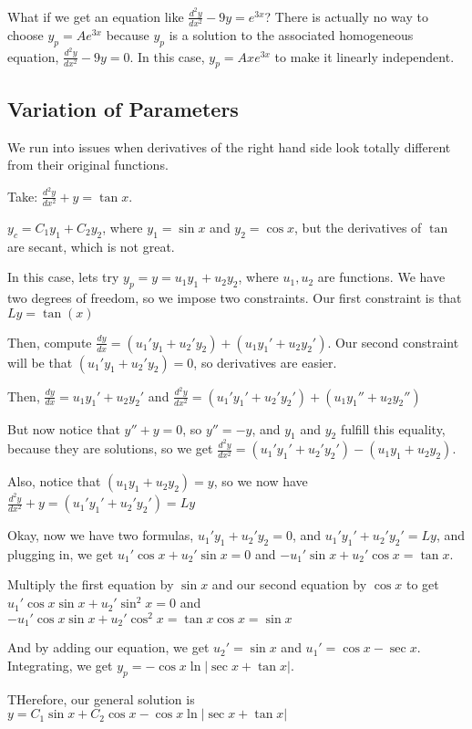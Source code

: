 \documentclass{article}
\begin{document}
What if we get an equation like $\frac{d^2y}{dx^2}-9y = e^{3x}$? There is actually no way to choose $y_p = Ae^{3x}$ because $y_p$ is a solution to the associated homogeneous equation, $\frac{d^2y}{dx^2}-9y =0$. In this case, $y_p = Axe^{3x}$ to make it linearly independent. 

\subsection{Variation of Parameters}

We run into issues when derivatives of the right hand side look totally different from their original functions.

Take: $\frac{d^2y}{dx^2} + y = \tan x$. 

$y_c = C_1y_1 + C_2y_2$, where $y_1 = \sin x$ and $y_2 = \cos x$, but the derivatives of $\tan$ are secant, which is not great. 

In this case, lets try $y_p = y = u_1y_1 + u_2 y_2$, where $u_1, u_2$ are functions. We have two degrees of freedom, so we impose two constraints. Our first constraint is that $Ly = \tan(x)$

Then, compute $ \frac{dy}{dx}  = (u_1'y_1 + u_2'y_2) + (u_1y_1' + u_2y_2')$. Our second constraint will be that $ (u_1'y_1 + u_2'y_2) = 0$, so derivatives are easier. 

Then, $\frac{dy}{dx} = u_1y_1' + u_2y_2'$ and $\frac{d^2y}{dx^2} = (u_1'y_1' + u_2'y_2') + (u_1y_1'' + u_2y_2'')$

But now notice that $y'' + y = 0$, so $y'' = -y$, and $y_1$ and $y_2$ fulfill this equality, because they are solutions, so we get $\frac{d^2y}{dx^2} = (u_1'y_1' + u_2'y_2') - (u_1y_1 + u_2y_2)$. 

Also, notice that $(u_1y_1 + u_2y_2) = y$, so we now have $\frac{d^2y}{dx^2} + y = (u_1'y_1' + u_2'y_2') = Ly$

Okay, now we have two formulas, $u_1'y_1 + u_2'y_2 = 0$, and $u_1'y_1' + u_2'y_2' = Ly$, and plugging in, we get $u_1' \cos x + u_2' \sin x = 0$ and $-u_1'\sin x + u_2'\cos x = \tan x$. 

Multiply the first equation by $\sin x$ and our second equation by $\cos x$ to get $u_1' \cos x \sin x + u_2'\sin^2 x = 0$ and $-u_1'\cos x \sin x + u_2'\cos^2x = \tan x \cos x = \sin x$

And by adding our equation, we get $u_2' = \sin x$ and $u_1' = \cos x - \sec x$. Integrating, we get $y_p = -\cos x \ln\vert\sec x + \tan x \vert$. 

THerefore, our general solution is $y = C_1\sin x + C_2 \cos x - \cos x \ln\vert\sec x + \tan x \vert$
\end{document}
